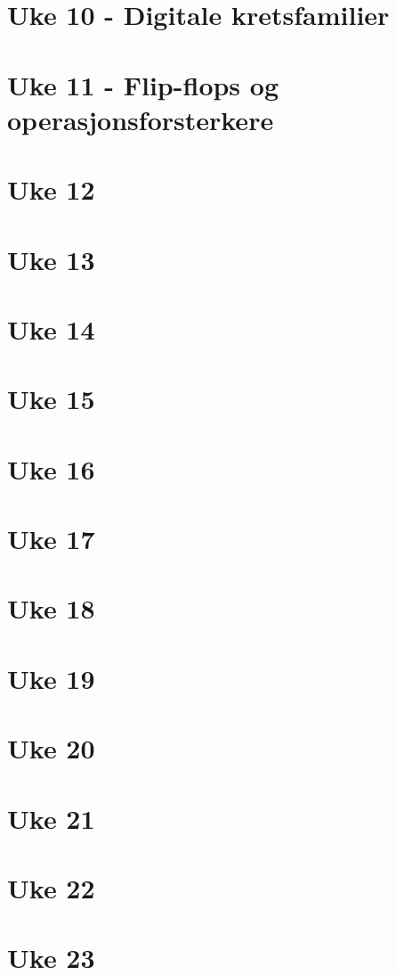 \documentclass{article}
\begin{document}
  \section{Uke 10 - Digitale kretsfamilier}
    

  \section{Uke 11 - Flip-flops og operasjonsforsterkere}
    

  \section{Uke 12}
    

  \section{Uke 13}
    

  \section{Uke 14}
    

  \section{Uke 15}
  \section{Uke 16}
  \section{Uke 17}
  \section{Uke 18}
  \section{Uke 19}
  \section{Uke 20}
  \section{Uke 21}
  \section{Uke 22}
  \section{Uke 23}
\end{document}
